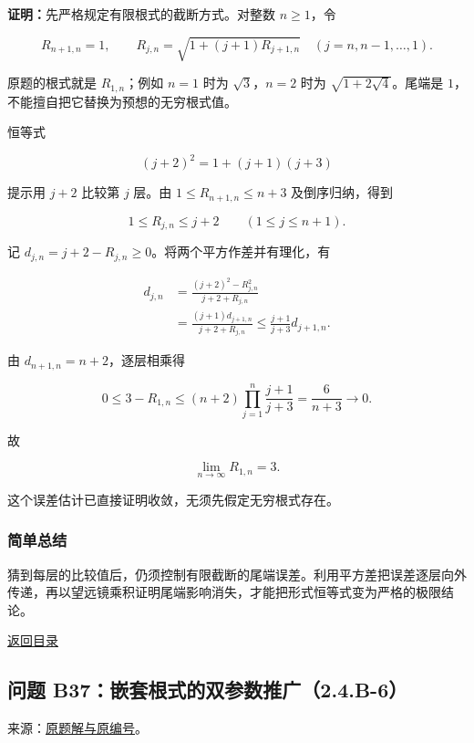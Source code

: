 \documentclass[11pt,a4paper]{article}
\begin{document}
\textbf{证明：}先严格规定有限根式的截断方式。对整数 \(n\ge1\)，令

\[
R_{n+1,n}=1,\qquad R_{j,n}=\sqrt{1+(j+1)R_{j+1,n}}\quad(j=n,n-1,\ldots,1).
\]

原题的根式就是 \(R_{1,n}\)；例如 \(n=1\) 时为 \(\sqrt3\)，\(n=2\) 时为
\(\sqrt{1+2\sqrt4}\)。尾端是 \(1\)，不能擅自把它替换为预想的无穷根式值。

恒等式

\[
(j+2)^2=1+(j+1)(j+3)
\]

提示用 \(j+2\) 比较第 \(j\) 层。由 \(1\le R_{n+1,n}\le n+3\)
及倒序归纳，得到

\[
1\le R_{j,n}\le j+2\qquad(1\le j\le n+1).
\]

记 \(d_{j,n}=j+2-R_{j,n}\ge0\)。将两个平方作差并有理化，有

\[
\begin{aligned}
d_{j,n}
&=\frac{(j+2)^2-R_{j,n}^2}{j+2+R_{j,n}}\\
&=\frac{(j+1)d_{j+1,n}}{j+2+R_{j,n}}
\le\frac{j+1}{j+3}d_{j+1,n}.
\end{aligned}
\]

由 \(d_{n+1,n}=n+2\)，逐层相乘得

\[
0\le3-R_{1,n}
\le(n+2)\prod_{j=1}^{n}\frac{j+1}{j+3}
=\frac6{n+3}\longrightarrow0.
\]

故

\[
\boxed{\lim_{n\to\infty}R_{1,n}=3.}
\]

这个误差估计已直接证明收敛，无须先假定无穷根式存在。

\subsubsection{简单总结}\label{ux7b80ux5355ux603bux7ed3-3}

猜到每层的比较值后，仍须控制有限截断的尾端误差。利用平方差把误差逐层向外传递，再以望远镜乘积证明尾端影响消失，才能把形式恒等式变为严格的极限结论。

\noindent\hyperref[contents]{返回目录}

\subsection{问题
B37：嵌套根式的双参数推广（2.4.B-6）}\label{ux95eeux9898-b37ux5d4cux5957ux6839ux5f0fux7684ux53ccux53c2ux6570ux63a8ux5e7f2.4.b-6}

来源：\href{https://zj139.github.io/math-notes/problems/0ce2ad9c1d045270806e755b/\#问题-b37}{原题解与原编号}。
\end{document}
